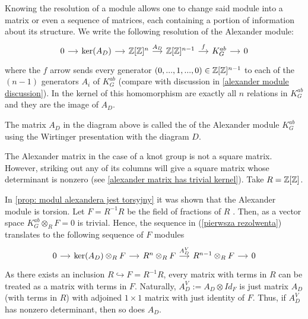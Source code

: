 Knowing the resolution of a module allows one to change said module into a matrix or even a sequence of matrices, each containing a portion of information about its structure.
We write the following resolution of the Alexander module:
\begin{equation}\label{pierwsza rezolwenta}
  \begin{tikzcd}[column sep=small]
    0\arrow[r] & \ker(A_D)\arrow[r] & \Z[\Z]^{n}\arrow[r, "A_D"] & \Z[\Z]^{n-1}\arrow[r, "f"] & K_G^{ab}\arrow[r] & 0
  \end{tikzcd}
\end{equation}
where the $f$ arrow sends every generator $(0,..., 1,...,0)\in\operatorname{\mathbb{Z}}[\operatorname{\mathbb{Z}}]^{n-1}$ to each of the $(n-1)$ generators $A_i$ of $K_G^{ab}$ (compare with discussion in \cref{alexander module discussion}). In the kernel of this homomorphism are exactly all $n$ relations in $K_G^{ab}$ and they are the image of $A_D$.

\begin{definition}\label{alexander matrix def}
  The matrix $A_D$ in the diagram above is called the  of the Alexander module $K_G^{ab}$ using the Wirtinger presentation with the diagram $D$.
\end{definition}

The Alexander matrix in the case of a knot group is not a square matrix. However, striking out any of its columns will give a square matrix whose determinant is nonzero (see \cref{alexander matrix has trivial kernel}).  Take $R=\operatorname{\mathbb{Z}}[\operatorname{\mathbb{Z}}]$. 

In \cref{prop: modul alexandera jest torsyjny} it was shown that the Alexander module is torsion. Let $F=R^{-1}R$ be the field of fractions of $R$ \cite[Chapter~2]{atiyah}. Then, as a vector space $K_G^{ab}\otimes_R F=0$ is trivial. Hence, the sequence in (\ref{pierwsza rezolwenta}) translates to the following sequence of $F$ modules
\begin{equation}\label{resolution vector spaces}
  \begin{tikzcd}[column sep=small]
    0\arrow[r] & \ker(A_D)\otimes_RF \arrow[r] & R^n\otimes_R F \arrow[r, "A_D^V"] & R^{n-1}\otimes_R F \arrow[r] & 0
  \end{tikzcd}
\end{equation}
As there exists an inclusion $R\hookrightarrow F=R^{-1}R$, every matrix with terms in $R$ can be treated as a matrix with terms in $F$. Naturally, $A_D^V:=A_D\otimes Id_{F}$ is just matrix $A_D$ (with terms in $R$) with adjoined $1\times 1$ matrix with just identity of $F$. Thus, if $A_D^V$ has nonzero determinant, then so does $A_D$.

